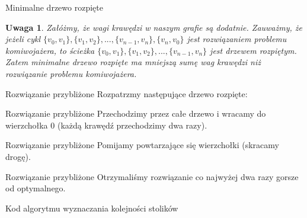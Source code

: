 \documentclass[a4paper,10pt]{beamer}
\newtheorem{uw}{Uwaga}[subsection]
\begin{document}
		\begin{frame}{Minimalne drzewo rozpięte}
			\begin{uw}
				Załóżmy, że wagi krawędzi w naszym grafie są dodatnie. Zauważmy, że jeżeli cykl $\{v_0, v_1\} , \{v_1, v_2\} , ... , \{v_{n-1}, v_n\} , \{v_n, v_0\}$ jest rozwiązaniem problemu komiwojażera, to ścieżka $\{v_0, v_1\} , \{v_1, v_2\} , ... , \{v_{n-1}, v_n\}$ jest drzewem rozpiętym. Zatem minimalne drzewo rozpięte ma mniejszą sumę wag krawędzi niż rozwiązanie problemu komiwojażera.
			\end{uw}
		\end{frame}
		\begin{frame}{Rozwiązanie przybliżone}
			Rozpatrzmy następujące drzewo rozpięte:
			\newline
			\newline
		\end{frame}
		\begin{frame}{Rozwiązanie przybliżone}
			Przechodzimy przez całe drzewo i wracamy do wierzchołka $0$ (każdą krawędź przechodzimy dwa razy).
		\end{frame}
		\begin{frame}{Rozwiązanie przybliżone}
			Pomijamy powtarzające się wierzchołki (skracamy drogę).
			\newline
			\newline
		\end{frame}
		\begin{frame}{Rozwiązanie przybliżone}
			Otrzymaliśmy rozwiązanie co najwyżej dwa razy gorsze od optymalnego.
			\newline
			\newline
		\end{frame}
		\begin{frame}{Kod algorytmu wyznaczania kolejności stolików}
		\end{frame}
\end{document}
